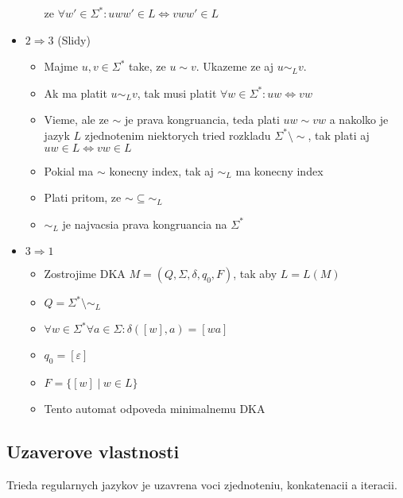\documentclass[12pt]{article}
\newcommand{\pipesep}{\hspace{3pt} \vert \hspace{3pt}}
\begin{document}
\begin{itemize}
\begin{itemize}
				ze $\forall w' \in \Sigma^{*}: uww' \in L \Leftrightarrow vww' \in L$
		\end{itemize}
	\item $2 \Rightarrow 3$ (Slidy)
		\begin{itemize}
			\item Majme $u,v \in \Sigma^{*}$ take, ze $u \sim v$. Ukazeme ze aj $u \sim_{L} v$.
			\item Ak ma platit $u \sim_{L} v$, tak musi platit $\forall w \in \Sigma^{*}: uw \Leftrightarrow vw$
			\item Vieme, ale ze $\sim$ je prava kongruancia, teda plati $uw \sim vw$ a nakolko je jazyk $L$
				zjednotenim niektorych tried rozkladu $\Sigma^{*}\setminus\sim$, tak plati aj
				$uw \in L \Leftrightarrow vw \in L$
			\item Pokial ma $\sim$ konecny index, tak aj $\sim_{L}$ ma konecny index
			\item Plati pritom, ze $\sim \subseteq \sim_{L}$
			\item $\sim_{L}$ je najvacsia prava kongruancia na $\Sigma^{*}$
		\end{itemize}
	\item $3 \Rightarrow 1$
		\begin{itemize}
			\item Zostrojime DKA $M = (Q,\Sigma,\delta,q_{0},F)$, tak aby $L = L(M)$
			\item $Q = \Sigma^{*}\setminus\sim_{L}$
			\item $\forall w \in \Sigma^{*} \forall a \in \Sigma: \delta([w], a) = [wa]$
			\item $q_{0} = [\varepsilon]$
			\item $F = \{[w]\pipesep w \in L\}$
			\item Tento automat odpoveda minimalnemu DKA
		\end{itemize}
\end{itemize}

\subsection*{Uzaverove vlastnosti}
Trieda regularnych jazykov je uzavrena voci zjednoteniu, konkatenacii a iteracii.
\end{document}
